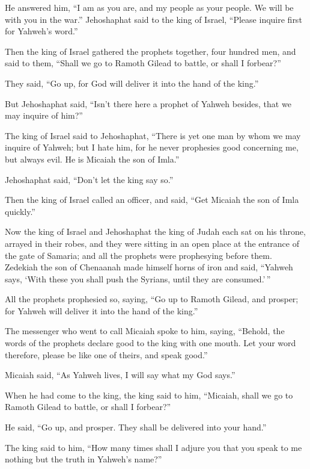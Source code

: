 \begin{paracol}{2}
\begin{otherlanguage}{english}
He answered him, ``I am as you are, and my people as your people. We
will be with you in the war.''  Jehoshaphat said to the
king of Israel, ``Please inquire first for Yahweh's word.''

 Then the king of Israel gathered the prophets together,
four hundred men, and said to them, ``Shall we go to Ramoth Gilead to
battle, or shall I forbear?''

They said, ``Go up, for God will deliver it into the hand of the king.''

 But Jehoshaphat said, ``Isn't there here a prophet of
Yahweh besides, that we may inquire of him?''

 The king of Israel said to Jehoshaphat, ``There is yet
one man by whom we may inquire of Yahweh; but I hate him, for he never
prophesies good concerning me, but always evil. He is Micaiah the son of
Imla.''

Jehoshaphat said, ``Don't let the king say so.''

 Then the king of Israel called an officer, and said,
``Get Micaiah the son of Imla quickly.''

 Now the king of Israel and Jehoshaphat the king of Judah
each sat on his throne, arrayed in their robes, and they were sitting in
an open place at the entrance of the gate of Samaria; and all the
prophets were prophesying before them.  Zedekiah the son
of Chenaanah made himself horns of iron and said, ``Yahweh says, `With
these you shall push the Syrians, until they are consumed.'\,''

 All the prophets prophesied so, saying, ``Go up to
Ramoth Gilead, and prosper; for Yahweh will deliver it into the hand of
the king.''

 The messenger who went to call Micaiah spoke to him,
saying, ``Behold, the words of the prophets declare good to the king
with one mouth. Let your word therefore, please be like one of theirs,
and speak good.''

 Micaiah said, ``As Yahweh lives, I will say what my God
says.''

 When he had come to the king, the king said to him,
``Micaiah, shall we go to Ramoth Gilead to battle, or shall I forbear?''

He said, ``Go up, and prosper. They shall be delivered into your hand.''

 The king said to him, ``How many times shall I adjure
you that you speak to me nothing but the truth in Yahweh's name?''


\end{otherlanguage}
\end{paracol}
